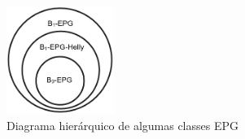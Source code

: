 \begin{figure}[htb]	
\center%
\includegraphics[width=3.5cm]{./img/diagramaClassesEPG.png}
\caption{Diagrama hierárquico de algumas classes  EPG}
\label{fig:diagramaEPG}
\end{figure}